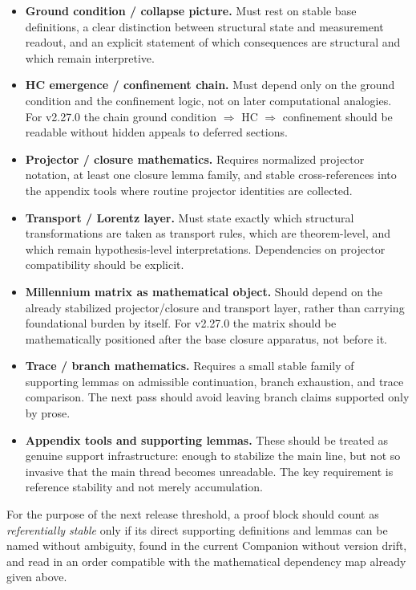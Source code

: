 \begin{itemize}
    \item \textbf{Ground condition / collapse picture.} Must rest on stable base definitions, a clear distinction between structural state and measurement readout, and an explicit statement of which consequences are structural and which remain interpretive.
    \item \textbf{HC emergence / confinement chain.} Must depend only on the ground condition and the confinement logic, not on later computational analogies. For v2.27.0 the chain ground condition $\Rightarrow$ HC $\Rightarrow$ confinement should be readable without hidden appeals to deferred sections.
    \item \textbf{Projector / closure mathematics.} Requires normalized projector notation, at least one closure lemma family, and stable cross-references into the appendix tools where routine projector identities are collected.
    \item \textbf{Transport / Lorentz layer.} Must state exactly which structural transformations are taken as transport rules, which are theorem-level, and which remain hypothesis-level interpretations. Dependencies on projector compatibility should be explicit.
    \item \textbf{Millennium matrix as mathematical object.} Should depend on the already stabilized projector/closure and transport layer, rather than carrying foundational burden by itself. For v2.27.0 the matrix should be mathematically positioned after the base closure apparatus, not before it.
    \item \textbf{Trace / branch mathematics.} Requires a small stable family of supporting lemmas on admissible continuation, branch exhaustion, and trace comparison. The next pass should avoid leaving branch claims supported only by prose.
    \item \textbf{Appendix tools and supporting lemmas.} These should be treated as genuine support infrastructure: enough to stabilize the main line, but not so invasive that the main thread becomes unreadable. The key requirement is reference stability and not merely accumulation.
\end{itemize}

For the purpose of the next release threshold, a proof block should count as \emph{referentially stable} only if its direct supporting definitions and lemmas can be named without ambiguity, found in the current Companion without version drift, and read in an order compatible with the mathematical dependency map already given above.


